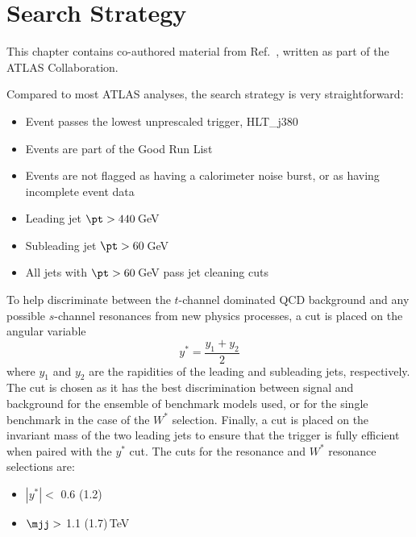 
\chapter{Search Strategy}
\label{ch:SearchStrategy}
This chapter contains co-authored material from Ref.~\cite{Dijet2017}, written as part of the ATLAS Collaboration.
\newline

Compared to most ATLAS analyses, the search strategy is very straightforward:

\begin{itemize}[noitemsep]
	\item Event passes the lowest unprescaled trigger, HLT\_j380
	\item Events are part of the Good Run List
	\item Events are not flagged as having a calorimeter noise burst, or as having incomplete event data
	\item Leading jet $\pt > 440$\,GeV
	\item Subleading jet $\pt > 60$\,GeV
	\item All jets with $\pt > 60$\,GeV pass jet cleaning cuts
\end{itemize}

To help discriminate between the $t$-channel dominated QCD background and any possible $s$-channel resonances from new physics processes, a cut is placed on the angular variable
\begin{equation}
y^* = \frac{y_1 + y_2}{2}
\end{equation}
where $y_1$ and $y_2$ are the rapidities of the leading and subleading jets, respectively.  The cut is chosen as it has the best discrimination between signal and background for the ensemble of benchmark models used, or for the single benchmark in the case of the $W^*$ selection.  Finally, a cut is placed on the invariant mass of the two leading jets to ensure that the trigger is fully efficient when paired with the $y^*$ cut.  The cuts for the resonance and $W^*$ resonance selections are:

\begin{itemize}[noitemsep]
	\item $|y^*| <$ 0.6 (1.2)
	\item $\mjj >$ 1.1 (1.7)\,TeV
\end{itemize}



